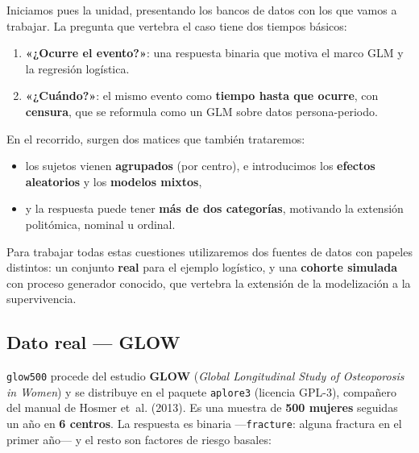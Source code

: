 \documentclass[
  letterpaper,
  DIV=11,
  numbers=noendperiod]{scrartcl}
\providecommand{\tightlist}{%
  \setlength{\itemsep}{0pt}\setlength{\parskip}{0pt}}\usepackage{longtable,booktabs,array}
\begin{document}
Iniciamos pues la unidad, presentando los bancos de datos con los que
vamos a trabajar. La pregunta que vertebra el caso tiene dos tiempos
básicos:

\begin{enumerate}
\def\labelenumi{\arabic{enumi}.}
\tightlist
\item
  \textbf{«¿Ocurre el evento?»}: una respuesta binaria que motiva el
  marco GLM y la regresión logística.
\item
  \textbf{«¿Cuándo?»}: el mismo evento como \textbf{tiempo hasta que
  ocurre}, con \textbf{censura}, que se reformula como un GLM sobre
  datos persona-periodo.
\end{enumerate}

En el recorrido, surgen dos matices que también trataremos:

\begin{itemize}
\tightlist
\item
  los sujetos vienen \textbf{agrupados} (por centro), e introducimos los
  \textbf{efectos aleatorios} y los \textbf{modelos mixtos},
\item
  y la respuesta puede tener \textbf{más de dos categorías}, motivando
  la extensión politómica, nominal u ordinal.
\end{itemize}

Para trabajar todas estas cuestiones utilizaremos dos fuentes de datos
con papeles distintos: un conjunto \textbf{real} para el ejemplo
logístico, y una \textbf{cohorte simulada} con proceso generador
conocido, que vertebra la extensión de la modelización a la
supervivencia.

\hypertarget{sec-datos-glow}{%
\subsection{Dato real --- GLOW}\label{sec-datos-glow}}

\texttt{glow500} procede del estudio \textbf{GLOW} (\emph{Global
Longitudinal Study of Osteoporosis in Women}) y se distribuye en el
paquete \texttt{aplore3} (licencia GPL-3), compañero del manual de
Hosmer et~al. (2013). Es una muestra de \textbf{500 mujeres} seguidas un
año en \textbf{6 centros}. La respuesta es binaria ---\texttt{fracture}:
alguna fractura en el primer año--- y el resto son factores de riesgo
basales:
\end{document}
